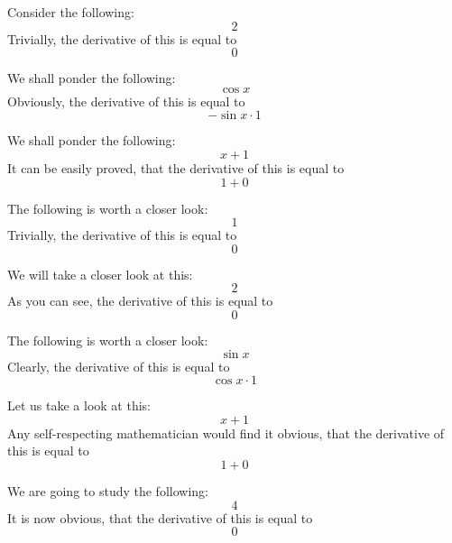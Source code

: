 \documentclass{article}
\begin{document}
Consider the following:
\begin{equation}
2 
\end{equation}
Trivially, the derivative of this is equal to
\begin{equation}
0 
\end{equation}

We shall ponder the following:
\begin{equation}
\cos x 
\end{equation}
Obviously, the derivative of this is equal to
\begin{equation}
-\sin x \cdot 1 
\end{equation}

We shall ponder the following:
\begin{equation}
x + 1 
\end{equation}
It can be easily proved, that the derivative of this is equal to
\begin{equation}
1 + 0 
\end{equation}

The following is worth a closer look:
\begin{equation}
1 
\end{equation}
Trivially, the derivative of this is equal to
\begin{equation}
0 
\end{equation}

We will take a closer look at this:
\begin{equation}
2 
\end{equation}
As you can see, the derivative of this is equal to
\begin{equation}
0 
\end{equation}

The following is worth a closer look:
\begin{equation}
\sin x 
\end{equation}
Clearly, the derivative of this is equal to
\begin{equation}
\cos x \cdot 1 
\end{equation}

Let us take a look at this:
\begin{equation}
x + 1 
\end{equation}
Any self-respecting mathematician would find it obvious, that the derivative of this is equal to
\begin{equation}
1 + 0 
\end{equation}

We are going to study the following:
\begin{equation}
4 
\end{equation}
It is now obvious, that the derivative of this is equal to
\begin{equation}
0 
\end{equation}
\end{document}
